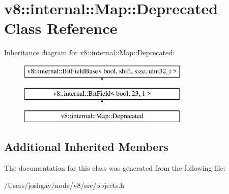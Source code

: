 \hypertarget{classv8_1_1internal_1_1_map_1_1_deprecated}{}\section{v8\+:\+:internal\+:\+:Map\+:\+:Deprecated Class Reference}
\label{classv8_1_1internal_1_1_map_1_1_deprecated}
Inheritance diagram for v8\+:\+:internal\+:\+:Map\+:\+:Deprecated\+:\begin{figure}[H]
\begin{center}
\leavevmode
\includegraphics[height=3.000000cm]{classv8_1_1internal_1_1_map_1_1_deprecated}
\end{center}
\end{figure}
\subsection*{Additional Inherited Members}


The documentation for this class was generated from the following file\+:\begin{DoxyCompactItemize}
\item 
/\+Users/joshgav/node/v8/src/objects.\+h\end{DoxyCompactItemize}

